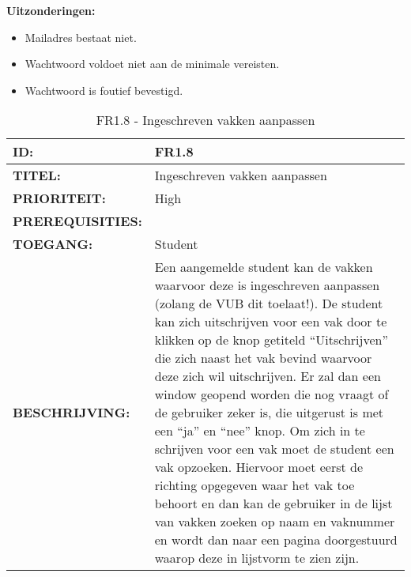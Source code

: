 \textbf{Uitzonderingen:}
\begin{itemize}
\item Mailadres bestaat niet.
\item Wachtwoord voldoet niet aan de minimale vereisten.
\item Wachtwoord is foutief bevestigd.
\end{itemize}

\noindent\begin{table}[H]
            \begin{tabular}{l | p{10cm}}
                \textbf{ID:} & FR1.8 \\ \hline
                \textbf{TITEL:} & Ingeschreven vakken aanpassen\\ \hline
                \textbf{PRIORITEIT:} &  High \\ \hline
                \textbf{PREREQUISITIES:} & \\ \hline
                \textbf{TOEGANG:} &  Student \\ \hline
                \textbf{BESCHRIJVING:} & Een aangemelde student kan de vakken waarvoor deze is ingeschreven aanpassen (zolang de VUB dit toelaat!). 
                                        De student kan zich uitschrijven voor een vak door te klikken op de knop getiteld “Uitschrijven” die zich naast het vak bevind waarvoor deze zich wil uitschrijven. 
                                        Er zal dan een window geopend worden die nog vraagt of de gebruiker zeker is, die uitgerust is met een “ja” en “nee” knop. 
                                        Om zich in te schrijven voor een vak moet de student een vak opzoeken. 
                                        Hiervoor moet eerst de richting opgegeven waar het vak toe behoort en dan kan de gebruiker in de lijst van vakken zoeken op naam en vaknummer en wordt dan naar een pagina doorgestuurd waarop deze in lijstvorm te zien zijn.\\
            \end{tabular}\\
            \caption{FR1.8 - Ingeschreven vakken aanpassen}
            \label{tab:FR1.8 - Ingeschreven vakken aanpassen}
        \end{table}
        
